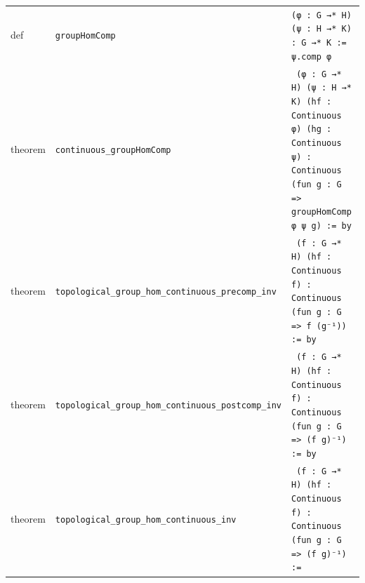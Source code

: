 \documentclass[11pt]{article}
\theoremstyle{definition}
\begin{document}
\begin{center}
\begin{tabular}{lll}
def & \texttt{groupHomComp} & \texttt{(φ : G →* H) (ψ : H →* K) : G →* K := ψ.comp φ} \\
theorem & \texttt{continuous\_groupHomComp} & \texttt{ (φ : G →* H) (ψ : H →* K) (hf : Continuous φ) (hg : Continuous ψ) : Continuous (fun g : G => groupHomComp φ ψ g) := by} \\
theorem & \texttt{topological\_group\_hom\_continuous\_precomp\_inv} & \texttt{ (f : G →* H) (hf : Continuous f) : Continuous (fun g : G => f (g⁻¹)) := by} \\
theorem & \texttt{topological\_group\_hom\_continuous\_postcomp\_inv} & \texttt{ (f : G →* H) (hf : Continuous f) : Continuous (fun g : G => (f g)⁻¹) := by} \\
theorem & \texttt{topological\_group\_hom\_continuous\_inv} & \texttt{ (f : G →* H) (hf : Continuous f) : Continuous (fun g : G => (f g)⁻¹) :=} \\
\end{tabular}
\end{center}
\end{document}
